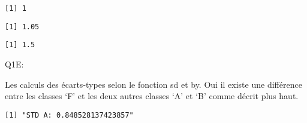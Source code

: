 \documentclass[
  letterpaper,
  DIV=11,
  numbers=noendperiod]{scrartcl}
\newenvironment{Shaded}{}{}
\newcommand{\AttributeTok}[1]{\textcolor[rgb]{0.84,0.23,0.29}{#1}}
\newcommand{\ConstantTok}[1]{\textcolor[rgb]{0.00,0.36,0.77}{#1}}
\newcommand{\FunctionTok}[1]{\textcolor[rgb]{0.44,0.26,0.76}{#1}}
\newcommand{\NormalTok}[1]{\textcolor[rgb]{0.14,0.16,0.18}{#1}}
\newcommand{\SpecialCharTok}[1]{\textcolor[rgb]{0.00,0.36,0.77}{#1}}
\newcommand{\StringTok}[1]{\textcolor[rgb]{0.01,0.18,0.38}{#1}}
\begin{document}
\begin{verbatim}
[1] 1
\end{verbatim}

\begin{Shaded}
\end{Shaded}

\begin{verbatim}
[1] 1.05
\end{verbatim}

\begin{Shaded}
\end{Shaded}

\begin{verbatim}
[1] 1.5
\end{verbatim}

Q1E:

Les calculs des écarts-types selon le fonction sd et by. Oui il existe
une différence entre les classes `F' et les deux autres classes `A' et
`B' comme décrit plus haut.

\begin{Shaded}
\end{Shaded}

\begin{verbatim}
[1] "STD A: 0.848528137423857"
\end{verbatim}
\end{document}
